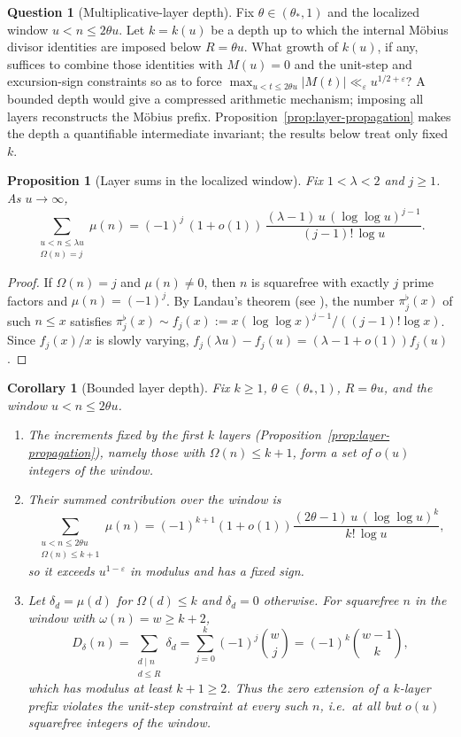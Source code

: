 \documentclass[11pt]{amsart}
\numberwithin{equation}{section}
\theoremstyle{plain}
\newtheorem{proposition}[theorem]{Proposition}
\newtheorem{corollary}[theorem]{Corollary}
\theoremstyle{definition}
\newtheorem{question}[theorem]{Question}
\theoremstyle{remark}
\newcommand{\eps}{\varepsilon}
\begin{document}
\begin{question}[Multiplicative-layer depth]
\label{q:layer-depth}
Fix $\theta\in(\theta_*,1)$ and the localized window $u<n\le2\theta u$.
Let $k=k(u)$ be a depth up to which the internal M\"obius divisor identities
are imposed below $R=\theta u$. What growth of $k(u)$, if any, suffices to
combine those identities with $M(u)=0$ and the unit-step and excursion-sign
constraints so as to force
$\max_{u<t\le2\theta u}|M(t)|\ll_\eps u^{1/2+\eps}$? A bounded depth would
give a compressed arithmetic mechanism; imposing all layers reconstructs the
M\"obius prefix. Proposition~\ref{prop:layer-propagation} makes the depth a
quantifiable intermediate invariant; the results below treat only fixed
$k$.
\end{question}
\begin{proposition}[Layer sums in the localized window]
\label{prop:layer-sums}
Fix $1<\lambda<2$ and $j\ge1$. As $u\to\infty$,
\begin{equation}
\label{eq:layer-sum}
\sum_{\substack{u<n\le\lambda u\\ \Omega(n)=j}}\mu(n)
=(-1)^j\,(1+o(1))\,\frac{(\lambda-1)\,u\,(\log\log u)^{j-1}}{(j-1)!\,\log u}.
\end{equation}
\end{proposition}

\begin{proof}
If $\Omega(n)=j$ and $\mu(n)\ne0$, then $n$ is squarefree with exactly $j$
prime factors and $\mu(n)=(-1)^j$. By Landau's theorem (see
\cite[Ch.~7]{MontgomeryVaughan2007}), the number $\pi_j^\flat(x)$ of such
$n\le x$ satisfies $\pi_j^\flat(x)\sim f_j(x):=x(\log\log x)^{j-1}/((j-1)!\log x)$.
Since $f_j(x)/x$ is slowly varying, $f_j(\lambda u)-f_j(u)=(\lambda-1+o(1))f_j(u)$.
\end{proof}

\begin{corollary}[Bounded layer depth]
\label{cor:bounded-depth}
Fix $k\ge1$, $\theta\in(\theta_*,1)$, $R=\theta u$, and the window
$u<n\le2\theta u$.
\begin{enumerate}[label=\textup{(\roman*)}]
\item The increments fixed by the first $k$ layers
(Proposition~\ref{prop:layer-propagation}), namely those with
$\Omega(n)\le k+1$, form a set of $o(u)$ integers of the window.
\item Their summed contribution over the window is
\[
\sum_{\substack{u<n\le2\theta u\\ \Omega(n)\le k+1}}\mu(n)
=(-1)^{k+1}(1+o(1))\frac{(2\theta-1)\,u\,(\log\log u)^{k}}{k!\,\log u},
\]
so it exceeds $u^{1-\eps}$ in modulus and has a fixed sign.
\item Let $\delta_d=\mu(d)$ for $\Omega(d)\le k$ and $\delta_d=0$ otherwise.
For squarefree $n$ in the window with $\omega(n)=w\ge k+2$,
\[
D_\delta(n)=\sum_{\substack{d\mid n\\ d\le R}}\delta_d
=\sum_{j=0}^{k}(-1)^j\binom wj=(-1)^k\binom{w-1}{k},
\]
which has modulus at least $k+1\ge2$. Thus the zero extension of a
$k$-layer prefix violates the unit-step constraint at every such $n$, i.e.\
at all but $o(u)$ squarefree integers of the window.
\end{enumerate}
\end{corollary}
\end{document}

